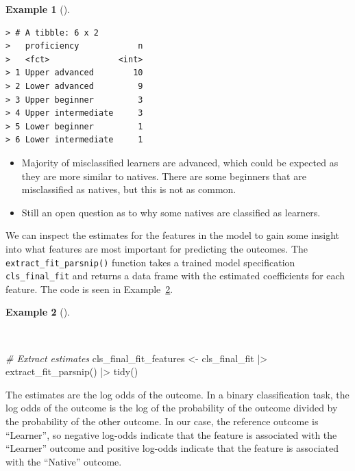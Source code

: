 \documentclass[
  letterpaper,
]{latex/krantz}
\newenvironment{Shaded}{\begin{snugshade}}{\end{snugshade}}
\newcommand{\CommentTok}[1]{\textcolor[rgb]{0.00,0.00,0.00}{\textit{#1}}}
\newcommand{\FunctionTok}[1]{\textcolor[rgb]{0.00,0.00,0.00}{#1}}
\newcommand{\NormalTok}[1]{\textcolor[rgb]{0.00,0.00,0.00}{#1}}
\newcommand{\OtherTok}[1]{\textcolor[rgb]{0.00,0.00,0.00}{#1}}
\newcommand{\SpecialCharTok}[1]{\textcolor[rgb]{0.00,0.00,0.00}{#1}}
\theoremstyle{definition}
\newtheorem{example}{Example}[chapter]
\theoremstyle{remark}
\begin{document}
\begin{example}[]
\begin{verbatim}
> # A tibble: 6 x 2
>   proficiency            n
>   <fct>              <int>
> 1 Upper advanced        10
> 2 Lower advanced         9
> 3 Upper beginner         3
> 4 Upper intermediate     3
> 5 Lower beginner         1
> 6 Lower intermediate     1
\end{verbatim}

\end{example}

\begin{itemize}
\item
  Majority of misclassified learners are advanced, which could be
  expected as they are more similar to natives. There are some beginners
  that are misclassified as natives, but this is not as common.
\item
  Still an open question as to why some natives are classified as
  learners.
\end{itemize}

We can inspect the estimates for the features in the model to gain some
insight into what features are most important for predicting the
outcomes. The \texttt{extract\_fit\_parsnip()} function takes a trained
model specification \texttt{cls\_final\_fit} and returns a data frame
with the estimated coefficients for each feature. The code is seen in
Example~\ref{exm-pda-class-tune-hyperparameters-evaluate-test-estimates}.

\begin{example}[]\protect\hypertarget{exm-pda-class-tune-hyperparameters-evaluate-test-estimates}{}\label{exm-pda-class-tune-hyperparameters-evaluate-test-estimates}

~

\begin{Shaded}
\begin{Highlighting}[]
\CommentTok{\# Extract estimates}
\NormalTok{cls\_final\_fit\_features }\OtherTok{\textless{}{-}}
\NormalTok{  cls\_final\_fit }\SpecialCharTok{|\textgreater{}}
  \FunctionTok{extract\_fit\_parsnip}\NormalTok{() }\SpecialCharTok{|\textgreater{}}
  \FunctionTok{tidy}\NormalTok{()}
\end{Highlighting}
\end{Shaded}

\end{example}

The estimates are the log odds of the outcome. In a binary
classification task, the log odds of the outcome is the log of the
probability of the outcome divided by the probability of the other
outcome. In our case, the reference outcome is ``Learner'', so negative
log-odds indicate that the feature is associated with the ``Learner''
outcome and positive log-odds indicate that the feature is associated
with the ``Native'' outcome.
\end{document}
